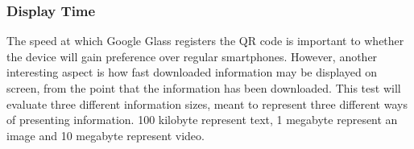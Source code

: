 		

\newpage
\subsubsection{Display Time}
The speed at which Google Glass registers the QR code is important to whether the device will gain preference over regular smartphones. However, another interesting aspect is how fast downloaded information may be displayed on screen, from the point that the information has been downloaded. %
This test will evaluate three different information sizes, meant to represent three different ways of presenting information. 100 kilobyte represent text, 1 megabyte represent an image and 10 megabyte represent video.

       


